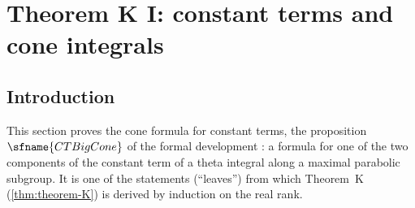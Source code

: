 \section{Theorem K I: constant terms and cone integrals}\label{sec:pf:thmK-cone}

\providecommand{\thmKconeAE}{\mathbb{A}_E}
\providecommand{\thmKconeS}{\mathcal{S}}
\providecommand{\thmKconeI}{\mathcal{I}}
\providecommand{\thmKconecone}{\operatorname{cone}}
\providecommand{\thmKconeht}{\operatorname{ht}}
\providecommand{\thmKconeform}{\operatorname{form}}
\providecommand{\thmKconePol}{\operatorname{PolData}}
\providecommand{\thmKconeiso}{\operatorname{iso}}
\providecommand{\thmKconeshift}{\operatorname{sh}}
\providecommand{\thmKconeStab}{Q}

\subsection{Introduction}\label{pf:thmK-cone:intro}

This section proves the cone formula for constant terms, the proposition $\sfname{CTBigCone}$ of the formal development
\cite{LeanSource2026}: a
formula for one of the two components of the constant term of a theta integral along a maximal parabolic subgroup.
It is one of the statements (``leaves'') from which Theorem~K (\cref{thm:theorem-K}) is derived by induction on the
real rank.

